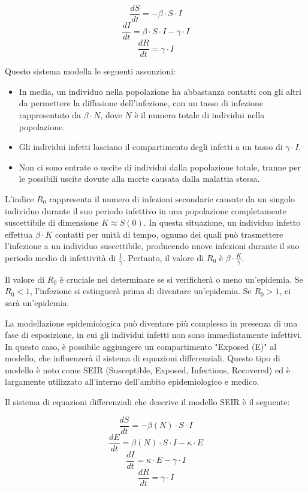 \[ \frac{dS}{dt} = -\beta \cdot S \cdot I \]
\[ \frac{dI}{dt} = \beta \cdot S \cdot I - \gamma \cdot I \]
\[ \frac{dR}{dt} = \gamma \cdot I \]

Questo sistema modella le seguenti assunzioni:

\begin{itemize}
    \item In media, un individuo nella popolazione ha abbastanza contatti 
    con gli altri da permettere la diffusione dell'infezione, con un tasso 
    di infezione rappresentato da $\beta \cdot N$, dove $N$ è il numero 
    totale di individui nella popolazione.
    \item Gli individui infetti lasciano il compartimento degli infetti a 
    un tasso di $\gamma \cdot I$.
    \item Non ci sono entrate o uscite di individui dalla popolazione 
    totale, tranne per le possibili uscite dovute alla morte causata 
    dalla malattia stessa.
\end{itemize}

L'indice $R_0$ rappresenta il numero di infezioni secondarie causate da 
un singolo individuo durante il suo periodo infettivo in una popolazione 
completamente suscettibile di dimensione $K \approx S(0)$. In questa 
situazione, un individuo infetto effettua $\beta \cdot K$ contatti per 
unità di tempo, ognuno dei quali può trasmettere l'infezione a un 
individuo suscettibile, producendo nuove infezioni durante il suo periodo 
medio di infettività di $\frac{1}{\gamma}$. Pertanto, il valore 
di $R_0$ è $\beta \cdot \frac{K}{\gamma}$.

Il valore di $R_0$ è cruciale nel determinare se si verificherà o meno 
un'epidemia. Se $R_0 < 1$, l'infezione si estinguerà prima di diventare 
un'epidemia. Se $R_0 > 1$, ci sarà un'epidemia.

La modellazione epidemiologica può diventare più complessa in presenza 
di una fase di esposizione, in cui gli individui infetti non sono 
immediatamente infettivi. In questo caso, è possibile aggiungere un 
compartimento "Exposed (E)" al modello, che influenzerà il sistema di 
equazioni differenziali. Questo tipo di modello è noto come SEIR 
(Susceptible, Exposed, Infectious, Recovered) ed è largamente
utilizzato all'interno dell'ambito epidemiologico e medico.

Il sistema di equazioni differenziali che descrive il modello SEIR è il seguente:

\[ \frac{dS}{dt} = - \beta(N) \cdot S \cdot I \]
\[ \frac{dE}{dt} = \beta(N) \cdot S \cdot I - \kappa \cdot E \]
\[ \frac{dI}{dt} = \kappa \cdot E - \gamma \cdot I \]
\[ \frac{dR}{dt} = \gamma \cdot I \]

